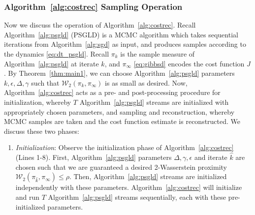 \documentclass[journal,onecolumn]{IEEEtran}
\newcommand{\step}{\epsilon}
\newcommand{\rew}{J}
\newcommand{\wass}{\mathcal{W}_2}
\newcommand{\gibbs}{\ids_{\infty}}
\newcommand{\ids}{\pi}
\newcommand{\idw}{\gamma}
\newcommand{\snum}{T}
\newcommand{\hk}{\hat{k}}
\begin{document}
{\color{black} \subsubsection{Algorithm~\ref{alg:costrec} Sampling Operation} 
\label{sec:alg3op}
Now we discuss the operation of Algorithm~\ref{alg:costrec}. Recall Algorithm~\ref{alg:psgld} (PSGLD) is a MCMC algorithm which takes sequential iterations from Algorithm~\ref{alg:sgd} as input, and produces samples according to the dynamics \eqref{eq:dt_psgld}. Recall $\pi_k$ is the sample measure of Algorithm~\ref{alg:psgld} at iterate $k$, and $\gibbs$ \eqref{eq:gibbsd} encodes the cost function $\rew$. By Theorem~\ref{thm:main1}, we can choose Algorithm~\ref{alg:psgld} parameters $k, \step, \Delta, \idw$ such that $\wass(\pi_k,\gibbs)$ is as small as desired. Now, Algorithm~\ref{alg:costrec} acts as a pre- and post-processing procedure for initialization, whereby $T$ Algorithm~\ref{alg:psgld} streams are initialized with appropriately chosen parameters, and sampling and reconstruction, whereby MCMC samples are taken and the cost function estimate is reconstructed. We discuss these two phases:
\begin{enumerate}[label=\roman*)]
    \item \textit{Initialization}: Observe the initialization phase of Algorithm~\ref{alg:costrec} (Lines 1-8). First, Algorithm~\ref{alg:psgld} parameters $\Delta,\gamma,\step$ and iterate $\hk$ are chosen such that we are guaranteed a desired 2-Wasserstein proximity $\wass(\pi_{\hk},\gibbs) \leq \rho$. Then, Algorithm~\ref{alg:psgld} streams are initialized independently with these parameters. Algorithm~\ref{alg:costrec} will initialize and run $\snum$ Algorithm~\ref{alg:psgld} streams sequentially, each with these pre-initialized parameters. 


\end{enumerate}}
\end{document}

